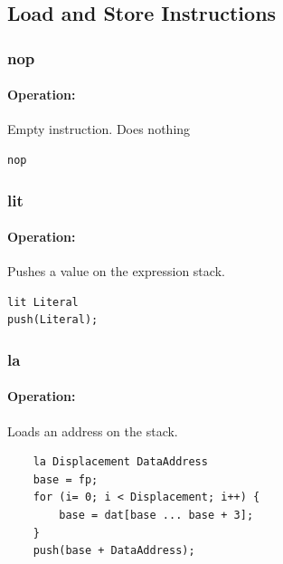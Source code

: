 \subsection{Load and Store Instructions}
\subsubsection{nop}

\paragraph{Operation:}
Empty instruction. Does nothing

\begin{lstlisting}
nop
\end{lstlisting}

\subsubsection{lit}

\paragraph{Operation:}
Pushes a value on the expression stack.

\begin{lstlisting}
lit Literal
push(Literal);
\end{lstlisting}


\subsubsection{la}

\paragraph{Operation:}
Loads an address on the stack.

	\begin{lstlisting}
	la Displacement DataAddress
	base = fp;
	for (i= 0; i < Displacement; i++) {
		base = dat[base ... base + 3];
	}
	push(base + DataAddress);
	\end{lstlisting}

